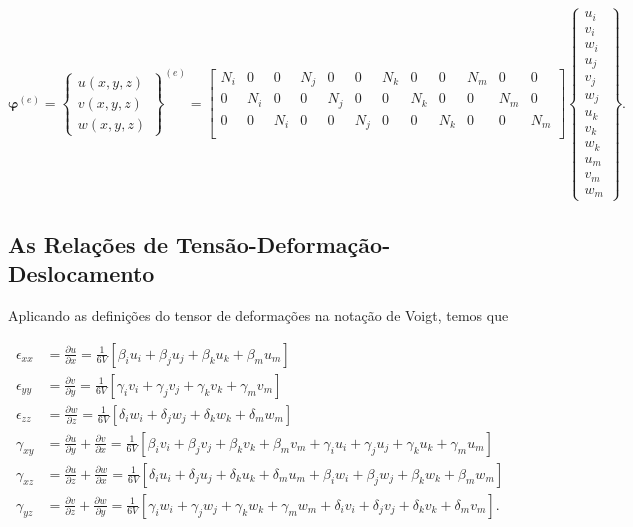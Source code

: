 \begin{equation}
    \bm{\varphi}^{(e)} = \begin{Bmatrix}
        u(x,y,z) \\
        v(x,y,z) \\
        w(x,y,z)
    \end{Bmatrix}^{(e)} = 
    \begin{bmatrix}
        N_i & 0   & 0   & N_j & 0   & 0   & N_k & 0   & 0   & N_m & 0   & 0 \\
        0   & N_i & 0   & 0   & N_j & 0   & 0   & N_k & 0   & 0   & N_m & 0 \\
        0   & 0   & N_i & 0   & 0   & N_j & 0   & 0   & N_k & 0   & 0   & N_m \\
    \end{bmatrix}
    \begin{Bmatrix}
        u_i \\ v_i \\ w_i \\ u_j \\ v_j \\ w_j \\ u_k \\ v_k \\ w_k \\ u_m \\ v_m \\ w_m
    \end{Bmatrix}.
\end{equation}

\subsection{As Relações de Tensão-Deformação-Deslocamento}

Aplicando as definições do tensor de deformações na notação de Voigt, temos que

\begin{align}
    \epsilon_{xx} &= \frac{\partial u}{\partial x} = \frac{1}{6V}[\beta_i u_i + \beta_j u_j + \beta_k u_k + \beta_m u_m] \\
    \epsilon_{yy} &= \frac{\partial v}{\partial y} = \frac{1}{6V}[\gamma_i v_i + \gamma_j v_j + \gamma_k v_k + \gamma_m v_m] \\
    \epsilon_{zz} &= \frac{\partial w}{\partial z} = \frac{1}{6V}[\delta_i w_i + \delta_j w_j + \delta_k w_k + \delta_m w_m] \\
    \gamma_{xy} &= \frac{\partial u}{\partial y} + \frac{\partial v}{\partial x} = \frac{1}{6V}[\beta_i v_i + \beta_j v_j + \beta_k v_k + \beta_m v_m + \gamma_i u_i + \gamma_j u_j + \gamma_k u_k + \gamma_m u_m] \\
    \gamma_{xz} &= \frac{\partial u}{\partial z} + \frac{\partial w}{\partial x} = \frac{1}{6V}[\delta_i u_i + \delta_j u_j + \delta_k u_k + \delta_m u_m + \beta_i w_i + \beta_j w_j + \beta_k w_k + \beta_m w_m] \\
    \gamma_{yz} &= \frac{\partial v}{\partial z} + \frac{\partial w}{\partial y} = \frac{1}{6V}[\gamma_i w_i + \gamma_j w_j + \gamma_k w_k + \gamma_m w_m + \delta_i v_i + \delta_j v_j + \delta_k v_k + \delta_m v_m].
\end{align}

